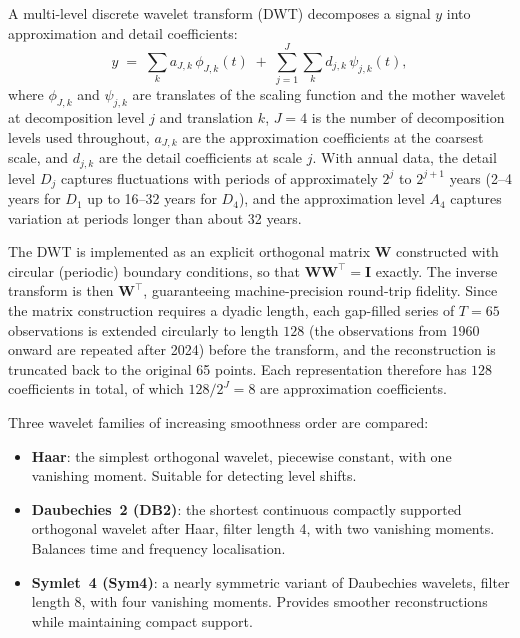 A multi-level discrete wavelet transform (DWT) decomposes a signal $y$ into
approximation and detail coefficients:
\begin{equation}
    y \;=\;
    \sum_{k} a_{J,k}\,\phi_{J,k}(t)
    \;+\;
    \sum_{j=1}^{J}\sum_{k} d_{j,k}\,\psi_{j,k}(t),
    \label{eq:dwt}
\end{equation}
where $\phi_{J,k}$ and $\psi_{j,k}$ are translates of the scaling function and
the mother wavelet at decomposition level $j$ and translation $k$, $J=4$ is the
number of decomposition levels used throughout, $a_{J,k}$ are the approximation
coefficients at the coarsest scale, and $d_{j,k}$ are the detail coefficients at
scale $j$. With annual data, the detail level $D_j$ captures fluctuations with
periods of approximately $2^{j}$ to $2^{j+1}$ years (2--4 years for $D_1$ up to
16--32 years for $D_4$), and the approximation level $A_4$ captures variation
at periods longer than about 32 years.

The DWT is implemented as an explicit orthogonal matrix $\mathbf{W}$ constructed
with circular (periodic) boundary conditions, so that
$\mathbf{W}\mathbf{W}^{\!\top} = \mathbf{I}$ exactly. The inverse transform is
then $\mathbf{W}^{\!\top}$, guaranteeing machine-precision round-trip fidelity.
Since the matrix construction requires a dyadic length, each gap-filled series
of $T = 65$ observations is extended circularly to length $128$ (the
observations from 1960 onward are repeated after 2024) before the transform,
and the reconstruction is truncated back to the original 65 points. Each
representation therefore has $128$ coefficients in total, of which
$128/2^{J} = 8$ are approximation coefficients.

Three wavelet families of increasing smoothness
order are compared:

\begin{itemize}
    \item \textbf{Haar}: the simplest orthogonal wavelet, piecewise constant,
          with one vanishing moment. Suitable for detecting level shifts.
    \item \textbf{Daubechies~2 (DB2)}: the shortest continuous compactly
          supported orthogonal wavelet after Haar, filter length 4, with two
          vanishing moments. Balances time and
          frequency localisation.
    \item \textbf{Symlet~4 (Sym4)}: a nearly symmetric variant of Daubechies
          wavelets, filter length 8, with four vanishing moments. Provides
          smoother reconstructions while maintaining compact support.
\end{itemize}

